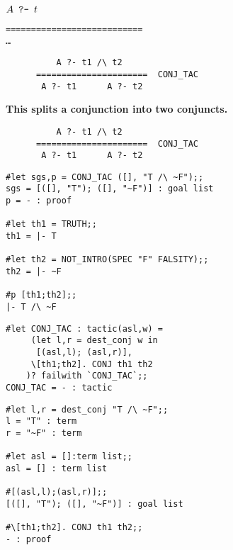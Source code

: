 \vskip7mm
\bpindent\LARGE\bf
\qquad\qquad$A\:\;\hbox{\verb+?-+}\;\:t$
\epindent
\vskip7mm
\vskip7mm
{\Large\begin{alltt}
     ===========================   
          \dots   {}
\end{alltt}}

\vskip7mm
\vskip7mm
{\Large\begin{verbatim}
          A ?- t1 /\ t2
      ======================  CONJ_TAC
       A ?- t1      A ?- t2
\end{verbatim}}
\vskip7mm
\bpindent\LARGE\bf
This splits a conjunction into two conjuncts.
\epindent


\vskip7mm
{\Large\begin{verbatim}
          A ?- t1 /\ t2
      ======================  CONJ_TAC
       A ?- t1      A ?- t2
\end{verbatim}}
\vskip7mm

\vskip4mm
\begin{session}\begin{verbatim}
#let sgs,p = CONJ_TAC ([], "T /\ ~F");;
sgs = [([], "T"); ([], "~F")] : goal list
p = - : proof

#let th1 = TRUTH;;
th1 = |- T

#let th2 = NOT_INTRO(SPEC "F" FALSITY);;
th2 = |- ~F

#p [th1;th2];;
|- T /\ ~F
\end{verbatim}\end{session}


\vskip 4mm
\begin{session}\begin{verbatim}
#let CONJ_TAC : tactic(asl,w) =
     (let l,r = dest_conj w in
      [(asl,l); (asl,r)],
     \[th1;th2]. CONJ th1 th2
    )? failwith `CONJ_TAC`;;
CONJ_TAC = - : tactic
\end{verbatim}\end{session}

\vskip 4mm
\begin{session}\begin{verbatim}
#let l,r = dest_conj "T /\ ~F";;
l = "T" : term
r = "~F" : term

#let asl = []:term list;;
asl = [] : term list

#[(asl,l);(asl,r)];;
[([], "T"); ([], "~F")] : goal list

#\[th1;th2]. CONJ th1 th2;;
- : proof
\end{verbatim}\end{session}

